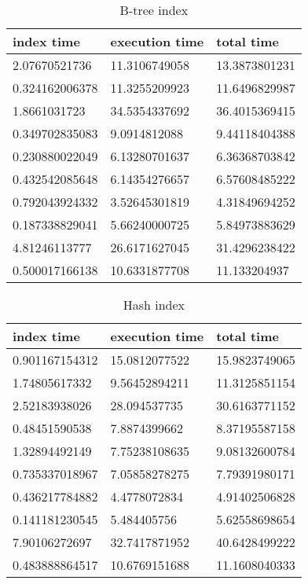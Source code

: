 \begin{itemize*}
\begin{table}[H]
\begin{center}
\begin{tabular}{|l|l|l|}
\hline
index time & execution time & total time                \\ \hline
2.07670521736  & 11.3106749058 & 13.3873801231 \\ \hline
0.324162006378 & 11.3255209923 & 11.6496829987 \\ \hline
1.8661031723   & 34.5354337692 & 36.4015369415 \\ \hline
0.349702835083 & 9.0914812088  & 9.44118404388 \\ \hline
0.230880022049 & 6.13280701637 & 6.36368703842 \\ \hline
0.432542085648 & 6.14354276657 & 6.57608485222 \\ \hline
0.792043924332 & 3.52645301819 & 4.31849694252 \\ \hline
0.187338829041 & 5.66240000725 & 5.84973883629 \\ \hline
4.81246113777  & 26.6171627045 & 31.4296238422 \\ \hline
0.500017166138 & 10.6331877708 & 11.133204937  \\ \hline
\end{tabular}
\end{center}
\caption{B-tree index}
\end{table}

\begin{table}[H]
\begin{center}
\begin{tabular}{|l|l|l|}
\hline
index time & execution time & total time     \\ \hline
0.901167154312 & 15.0812077522 & 15.9823749065 \\ \hline
1.74805617332  & 9.56452894211 & 11.3125851154 \\ \hline
2.52183938026  & 28.094537735  & 30.6163771152 \\ \hline
0.48451590538  & 7.8874399662  & 8.37195587158 \\ \hline
1.32894492149  & 7.75238108635 & 9.08132600784 \\ \hline
0.735337018967 & 7.05858278275 & 7.79391980171 \\ \hline
0.436217784882 & 4.4778072834  & 4.91402506828 \\ \hline
0.141181230545 & 5.484405756   & 5.62558698654 \\ \hline
7.90106272697  & 32.7417871952 & 40.6428499222 \\ \hline
0.483888864517 & 10.6769151688 & 11.1608040333 \\ \hline
\end{tabular}
\end{center}
\caption{Hash index}
\end{table}



\end{itemize*}
